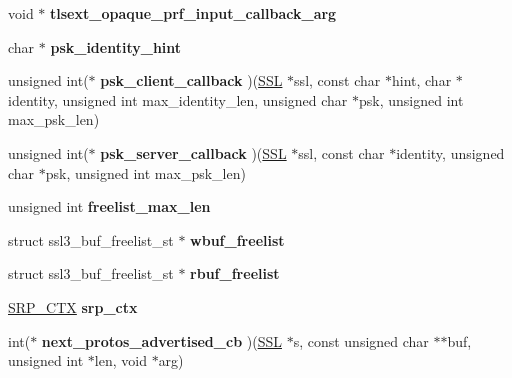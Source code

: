 \begin{DoxyCompactItemize}
void $\ast$ {\bfseries tlsext\+\_\+opaque\+\_\+prf\+\_\+input\+\_\+callback\+\_\+arg}
\item 
\mbox{\label{structssl__ctx__st_a8834b3e8d91529f7339f8648d20a884b}} 
char $\ast$ {\bfseries psk\+\_\+identity\+\_\+hint}
\item 
\mbox{\label{structssl__ctx__st_aea631f9715f6e5af8ba0194353782229}} 
unsigned int($\ast$ {\bfseries psk\+\_\+client\+\_\+callback} )(\hyperlink{structssl__st}{S\+SL} $\ast$ssl, const char $\ast$hint, char $\ast$identity, unsigned int max\+\_\+identity\+\_\+len, unsigned char $\ast$psk, unsigned int max\+\_\+psk\+\_\+len)
\item 
\mbox{\label{structssl__ctx__st_a2102c8eaff09b0b5d9e1d89e8c4d27dc}} 
unsigned int($\ast$ {\bfseries psk\+\_\+server\+\_\+callback} )(\hyperlink{structssl__st}{S\+SL} $\ast$ssl, const char $\ast$identity, unsigned char $\ast$psk, unsigned int max\+\_\+psk\+\_\+len)
\item 
\mbox{\label{structssl__ctx__st_ac7e703cc2f4d778d8c27cae612975ddb}} 
unsigned int {\bfseries freelist\+\_\+max\+\_\+len}
\item 
\mbox{\label{structssl__ctx__st_a523c86950f05f20b48fa4e21b39f216f}} 
struct ssl3\+\_\+buf\+\_\+freelist\+\_\+st $\ast$ {\bfseries wbuf\+\_\+freelist}
\item 
\mbox{\label{structssl__ctx__st_a5e371436a68dffc99cab280da6b8f65b}} 
struct ssl3\+\_\+buf\+\_\+freelist\+\_\+st $\ast$ {\bfseries rbuf\+\_\+freelist}
\item 
\mbox{\label{structssl__ctx__st_a337f1046f4778a8835a72230f2c1f138}} 
\hyperlink{structsrp__ctx__st}{S\+R\+P\+\_\+\+C\+TX} {\bfseries srp\+\_\+ctx}
\item 
\mbox{\label{structssl__ctx__st_adb86f747421d5b58cf4bb5a49e2852bf}} 
int($\ast$ {\bfseries next\+\_\+protos\+\_\+advertised\+\_\+cb} )(\hyperlink{structssl__st}{S\+SL} $\ast$s, const unsigned char $\ast$$\ast$buf, unsigned int $\ast$len, void $\ast$arg)
\item 
\mbox{\label{structssl__ctx__st_ac8a1f0523b26a16a16af4776041850f6}} 
$$
\end{DoxyCompactItemize}
